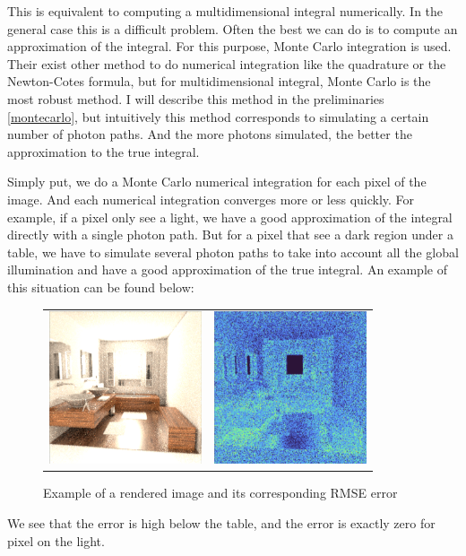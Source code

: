 \documentclass{classeENS}
\begin{document}
\par This is equivalent to computing a multidimensional integral numerically. 
In the general case this is a difficult problem. Often the best we can do is 
to compute an approximation of the integral. For this purpose, Monte Carlo integration 
is used. Their exist other method to do numerical integration like the quadrature or 
the Newton-Cotes formula, but for multidimensional integral, Monte Carlo is the
most robust method.
I will describe this method in the preliminaries \ref{montecarlo}, 
but intuitively this method corresponds to simulating a certain 
number of photon paths. And the more photons simulated, the better 
the approximation to the true integral.

\par Simply put, we do a Monte Carlo numerical integration for each pixel 
of the image. And each numerical integration converges more or less quickly. 
For example, if a pixel only see a light, we have a good approximation 
of the integral directly with a single photon path. But for a pixel that see a dark 
region under a table, we have to simulate several photon paths to take into account
all the global illumination and have a good approximation of the true integral. An example
of this situation can be found below:

\begin{figure}[H]
    \centering
    \caption{Example of a rendered image and its corresponding RMSE error}
    \begin{tabular}{cc}
    \includegraphics[width=45mm]{image/initial_rendered.png}
    & \includegraphics[width=45mm]{image/initial_error.png}
    \end{tabular}
\end{figure}
We see that the error is high below the table, and the error is exactly zero for pixel on 
the light.
\end{document}
